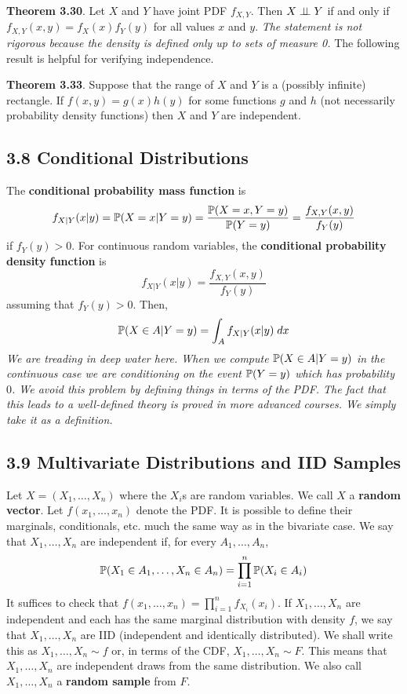 \textbf{Theorem 3.30}. Let \(X\) and \(Y\) have joint PDF \(f_{X, Y}\). Then \(X \perp\!\!\!\perp Y\) if and only if \(f_{X, Y}(x, y) = f_X(x) f_Y(y)\) for all values \(x\) and \(y\).
\emph{The statement is not rigorous because the density is defined only up to sets of measure 0.}
The following result is helpful for verifying independence.

\textbf{Theorem 3.33}. Suppose that the range of \(X\) and \(Y\) is a (possibly infinite) rectangle. If \(f(x, y) = g(x) h(y)\) for some functions \(g\) and \(h\) (not necessarily probability density functions) then \(X\) and \(Y\) are independent.

\subsection*{3.8 Conditional Distributions}\label{conditional-distributions}
The \textbf{conditional probability mass function} is
\[
f_{X | Y}(x | y) = \operatorname{\mathbb{P}}(X = x | Y = y) = \frac{\operatorname{\mathbb{P}}(X = x, Y = y)}{\operatorname{\mathbb{P}}(Y = y)} = \frac{f_{X, Y}(x, y)}{f_Y(y)}
\]
if \(f_Y(y) > 0\).
For continuous random variables, the \textbf{conditional probability density function} is
\[
f_{X | Y}(x | y) = \frac{f_{X, Y}(x, y)}{f_Y(y)}
\]
assuming that \(f_Y(y) > 0\). Then,
\[
\operatorname{\mathbb{P}}(X \in A | Y = y) = \int_A f_{X | Y}(x | y) \; dx
\]
\emph{We are treading in deep water here. When we compute \(\operatorname{\mathbb{P}}(X \in A | Y = y)\) in the continuous case we are conditioning on the event \(\operatorname{\mathbb{P}}(Y = y)\) which has probability $0$. We avoid this problem by defining things in terms of the PDF. The fact that this leads to a well-defined theory is proved in more advanced courses. We simply take it as a definition.}

\subsection*{3.9 Multivariate Distributions and IID Samples}\label{multivariate-distributions-and-iid-samples}
Let \(X = (X_{1}, \dots, X_{n})\) where the \(X_{i}\)s are random variables. We call \(X\) a \textbf{random vector}. Let \(f(x_{1}, \dots, x_{n})\) denote the PDF. It is possible to define their marginals, conditionals, etc. much the same way as in the bivariate case. We say that \(X_{1}, \dots, X_{n}\) are independent if, for every \(A_{1}, \dots, A_{n}\),
\[
\operatorname{\mathbb{P}}(X_{1} \in A_{1}, \dots, X_{n} \in A_{n}) = \prod_{i=1}^{n} \operatorname{\mathbb{P}}(X_{i} \in A_{i})
\]
It suffices to check that \(f(x_{1}, \dots, x_{n}) = \prod_{i=1}^{n} f_{X_{i}}(x_{i})\). If \(X_{1}, \dots, X_{n}\) are independent and each has the same marginal distribution with density \(f\), we say that \(X_{1}, \dots, X_{n}\) are IID (independent and identically distributed). We shall write this as \(X_{1}, \dots, X_{n} \sim f\) or, in terms of the CDF, \(X_{1}, \dots, X_{n} \sim F\). This means that \(X_{1}, \dots, X_{n}\) are independent draws from the same distribution. We also call \(X_{1}, \dots, X_{n}\) a \textbf{random sample} from \(F\).

